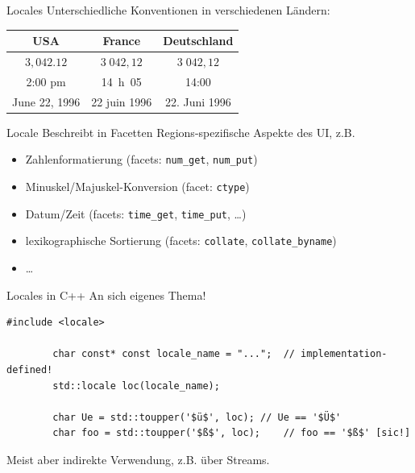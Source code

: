 \begin{frame}{Locales}
	Unterschiedliche Konventionen in verschiedenen Ländern:
	
	\vspace{1em}
	
	\begin{tabular}{c|c|c}
		\textbf{USA}	&	\textbf{France}	&	\textbf{Deutschland}	\\
		\hline
		$3,042.12$		&	$3\;042,12$		&	$3\;042,12$				\\
		2:00 pm			&	14~h~05			&	14:00					\\
		June 22, 1996	&	22 juin 1996	&	22. Juni 1996			\\
	\end{tabular}
	
	\pause
	\vspace{0.5em}
	
	\begin{block}{Locale}
		Beschreibt in Facetten Regions-spezifische Aspekte des UI, z.B.
		\begin{itemize}
			\item Zahlenformatierung (facets: \texttt{num\_get}, \texttt{num\_put})
			\item Minuskel/Majuskel-Konversion (facet: \texttt{ctype})
			\item Datum/Zeit (facets: \texttt{time\_get}, \texttt{time\_put}, \dots)
			\item lexikographische Sortierung (facets: \texttt{collate}, \texttt{collate\_byname})
			\item \dots
		\end{itemize}
	\end{block}
\end{frame}

\begin{frame}[fragile]{Locales in C++}
	\alert{ An sich eigenes Thema! }
	
	\pause
	\vspace{2em}
	
	\begin{lstlisting}[escapechar=\$]
		#include <locale>
		
		char const* const locale_name = "...";	// implementation-defined!
		std::locale loc(locale_name);
		
		char Ue = std::toupper('$ü$', loc);	// Ue == '$Ü$'
		char foo = std::toupper('$ß$', loc);	// foo == '$ß$' [sic!]
	\end{lstlisting}
	
	\vspace{1em}
	Meist aber indirekte Verwendung, z.B. über Streams.
\end{frame}


